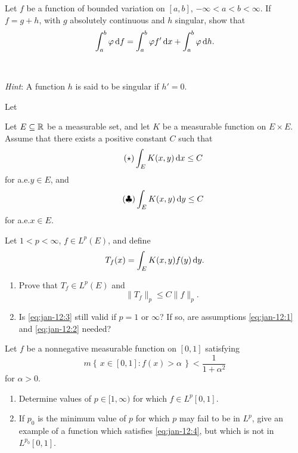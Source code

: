 \begin{problem}
  Let \(f\) be a function of bounded variation on \([a,b]\),
  \(-\infty<a<b<\infty\). If \(f=g+h\), with \(g\) absolutely continuous
  and \(h\) singular, show that
  \[
    \int_a^b\varphi\mathop{}\!\mathrm{d} f=\int_a^b\varphi f'\mathop{}\!\mathrm{d} x+\int_a^b\varphi\mathop{}\!\mathrm{d}
    h.
  \]
  \\\\
  \emph{Hint}: A function \(h\) is said to be singular if \(h'=0\).
\end{problem}
\begin{solution}
  Let
\end{solution}

\begin{problem}
  Let \(E\subseteq\mathbb{R}\) be a measurable set, and let \(K\) be a measurable
  function on \(E\times E\). Assume that there exists a positive constant
  \(C\) such that
  \[
    \label{eq:jan-12:1}
    \tag{\(\star\)}
    \int_E K(x,y)\mathop{}\!\mathrm{d} x\leq C
  \]
  for a.e.\@ \(y\in E\), and
  \[
    \label{eq:jan-12:2}
    \tag{\(\clubsuit\)}
    \int_E K(x,y)\mathop{}\!\mathrm{d} y\leq C
  \]
  for a.e.\@ \(x\in E\).

  Let \(1<p<\infty\), \(f\in L^p(E)\), and define
  \[
    T_f(x)=\int_E K(x,y)f(y)\mathop{}\!\mathrm{d} y.
  \]
  \begin{enumerate}[label=(\alph*)]
  \item Prove that \(T_f\in L^p(E)\) and
    \[
      \label{eq:jan-12:3}
      \tag{\(\spadesuit\)}
      \|T_f\|_p\leq C\|f\|_p.
    \]
  \item Is \eqref{eq:jan-12:3} still valid if \(p=1\) or \(\infty\)? If so,
    are assumptions \eqref{eq:jan-12:1} and \eqref{eq:jan-12:2} needed?
  \end{enumerate}
\end{problem}
\begin{solution}
\end{solution}

\begin{problem}
  Let \(f\) be a nonnegative measurable function on \([0,1]\) satisfying
  \[
    \label{eq:jan-12:4}%
    \tag{\(\blacklozenge\)}%
    m\left\{\,x\in[0,1]:f(x)>\alpha\,\right\}<\frac{1}{1+\alpha^2}
  \]
  for \(\alpha>0\).
  \begin{enumerate}[label=(\alph*)]
  \item Determine values of \(p\in[1,\infty)\) for which \(f\in L^p[0,1]\).
  \item If \(p_0\) is the minimum value of \(p\) for which \(p\) may fail
    to be in \(L^p\), give an example of a function which satisfies
    \eqref{eq:jan-12:4}, but which is not in \(L^{p_0}[0,1]\).
\end{enumerate}
\end{problem}
\begin{solution}
\end{solution}

